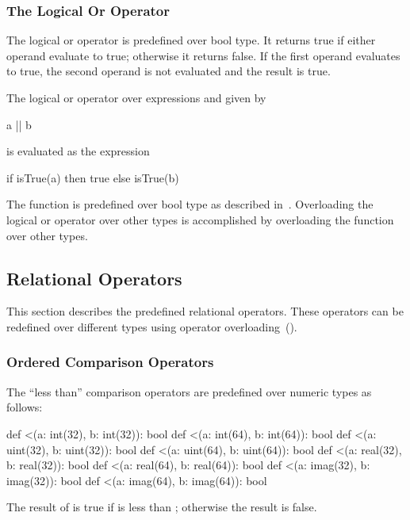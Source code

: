 \subsubsection{The Logical Or Operator}
\label{Logical_Or_Operators}

The logical or operator is predefined over bool type.  It returns
true if either operand evaluate to true; otherwise it returns false.
If the first operand evaluates to true, the second operand is not
evaluated and the result is true.

The logical or operator over expressions  and  given
by
\begin{chapel}
a || b
\end{chapel}
is evaluated as the expression
\begin{chapel}
if isTrue(a) then true else isTrue(b)
\end{chapel}

The function  is predefined over bool type as described
in~.  Overloading the logical or operator
over other types is accomplished by overloading the 
function over other types.

\subsection{Relational Operators}
\label{Relational_Operators}

This section describes the predefined relational operators.  These
operators can be redefined over different types using operator
overloading~().

\subsubsection{Ordered Comparison Operators}
\label{Ordered_Comparison_Operators}

The ``less than'' comparison operators are predefined over numeric
types as follows:
\begin{chapel}
def <(a: int(32), b: int(32)): bool
def <(a: int(64), b: int(64)): bool
def <(a: uint(32), b: uint(32)): bool
def <(a: uint(64), b: uint(64)): bool
def <(a: real(32), b: real(32)): bool
def <(a: real(64), b: real(64)): bool
def <(a: imag(32), b: imag(32)): bool
def <(a: imag(64), b: imag(64)): bool
\end{chapel}
The result of  is true if  is less than ;
otherwise the result is false.

